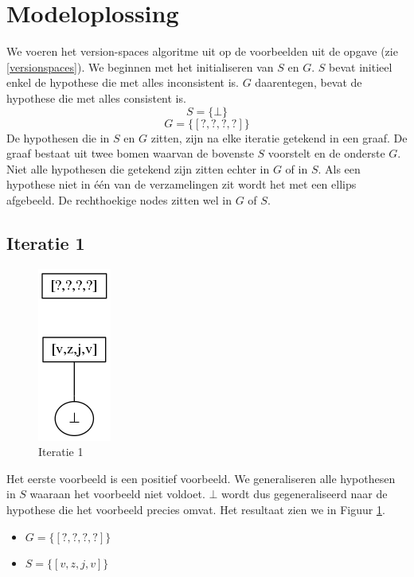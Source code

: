 \documentclass[alternative-exam.tex]{subfiles}
\begin{document}
\section{Modeloplossing}
We voeren het version-spaces algoritme uit op de voorbeelden uit de opgave (zie \ref{versionspaces}). We beginnen met het initialiseren van $S$ en $G$. $S$ bevat initieel enkel de hypothese die met alles inconsistent is. $G$ daarentegen, bevat de hypothese die met alles consistent is.
\[
S = \{\bot\}
\]
\[
G = \{[?,?,?,?]\}
\]
De hypothesen die in $S$ en $G$ zitten, zijn na elke iteratie getekend in een graaf. De graaf bestaat uit twee bomen waarvan de bovenste $S$ voorstelt en de onderste $G$. Niet alle hypothesen die getekend zijn zitten echter in $G$ of in $S$. Als een hypothese niet in \'e\'en van de verzamelingen zit wordt het met een ellips afgebeeld. De rechthoekige nodes zitten wel in $G$ of $S$.
\subsection{Iteratie 1}
\begin{figure}
[H]
\centering
\caption{Iteratie 1}
\label{iter_1}
\includegraphics[scale=0.5]{resources/graphs/iteration_1.png}
\end{figure}
Het eerste voorbeeld is een positief voorbeeld. We generaliseren alle hypothesen in $S$ waaraan het voorbeeld niet voldoet. $\bot$ wordt dus gegeneraliseerd naar de hypothese die het voorbeeld precies omvat. Het resultaat zien we in Figuur \ref{iter_1}.
\begin{itemize}
\item $G = \{[?,?,?,?]\}$
\item $S = \{[v,z,j,v]\}$
\end{itemize}
\end{document}
